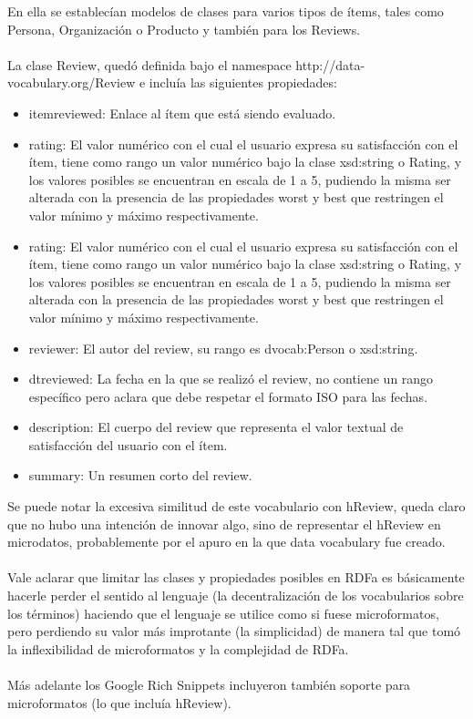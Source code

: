 En ella se establecían modelos de clases para varios tipos de ítems, tales como Persona, Organización o Producto y también para los Reviews.
\\\\
La clase Review, quedó definida bajo el namespace http://data-vocabulary.org/Review e incluía las siguientes propiedades:
\begin{itemize}
 \item itemreviewed: Enlace al ítem que está siendo evaluado.
 \item rating: El valor numérico con el cual el usuario expresa su satisfacción con el ítem, tiene como rango un valor numérico bajo la clase 
 xsd:string o Rating, y los valores posibles se encuentran en escala de 1 a 5, pudiendo la misma ser alterada con la presencia de las 
 propiedades worst y best que restringen el valor mínimo y máximo respectivamente.
 \item rating: El valor numérico con el cual el usuario expresa su satisfacción con el ítem, tiene como rango un valor numérico bajo la clase 
 xsd:string o Rating, y los valores posibles se encuentran en escala de 1 a 5, pudiendo la misma ser alterada con la presencia de las 
 propiedades worst y best que restringen el valor mínimo y máximo respectivamente.
 \item reviewer: El autor del review, su rango es dvocab:Person o xsd:string.
 \item dtreviewed: La fecha en la que se realizó el review, no contiene un rango específico pero aclara que debe respetar el formato 
 ISO para las fechas.
 \item description: El cuerpo del review que representa el valor textual de satisfacción del usuario con el ítem.
 \item summary: Un resumen corto del review.
\end{itemize}

Se puede notar la excesiva similitud de este vocabulario con hReview, queda claro que no hubo una intención de innovar algo, 
sino de representar el hReview en microdatos, probablemente por el apuro en la que data vocabulary fue creado.
\\\\
Vale aclarar que limitar las clases y propiedades posibles en RDFa es básicamente hacerle perder el sentido al lenguaje 
(la decentralización de los vocabularios sobre los términos) haciendo que el lenguaje se utilice como si fuese microformatos, 
pero perdiendo su valor más improtante (la simplicidad) de manera tal que tomó la inflexibilidad de microformatos y la complejidad 
de RDFa.
\\\\
Más adelante los Google Rich Snippets incluyeron también soporte para microformatos (lo que incluía hReview). 


